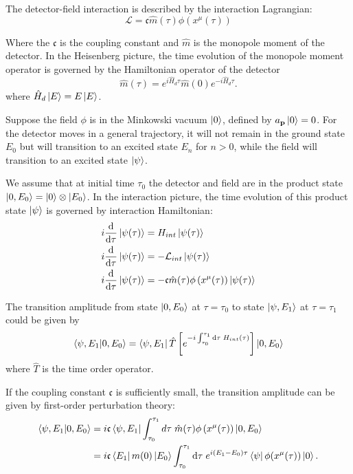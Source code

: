 \documentclass[12pt]{article}
\numberwithin{equation}{subsection}
\theoremstyle{mystyle}{\newtheorem{definition}{Definition}[subsection]}
\theoremstyle{mystyle}{\newtheorem{theorem}[definition]{Theorem}}
\theoremstyle{mystyle}{\newtheorem*{remark}{Remark}}
\theoremstyle{mystyle}{\newtheorem{example}{Example}[subsection]}
\theoremstyle{mystyle}{\newtheorem{examples}{Examples}[subsection]}
\theoremstyle{mystyle}{\newtheorem{cthm}{}[subsection]}
\newcommand{\id}{\mathrm{d}}
\begin{document}
\par The detector-field interaction is described by the interaction Lagrangian:
\begin{equation}
  \mathcal{L}=\mathfrak{c} \hat{m}(\tau)\phi\left(x^{\mu}(\tau)\right)
\end{equation}

Where the \(\mathfrak{c}\) is the coupling constant and \(\hat{m}\) is the monopole moment of the detector.
In the Heisenberg picture, the time evolution of the monopole moment operator is governed by the Hamiltonian operator of the detector
\begin{equation}
  \hat{m}(\tau)= e^{i\hat{H}_d\tau}\hat{m}(0)e^{-i\hat{H}_d\tau}.
\end{equation}
where \(\hat{H}_d\ket{E}=E\ket{E}\).

Suppose the field \(\phi\) is in the Minkowski vacuum \(\ket{0}\), defined by \(a_{\mathbf{p}}\ket{0}=0\).
For the detector moves in a general trajectory,
it will not remain in the ground state \(E_0\) but will transition to an excited state \(E_n\) for \(n>0\),
while the field will transition to an excited state \(\ket{\psi}\). 

We assume that at initial time \(\tau_0\) the detector and field are in the product state \(\ket{0,E_0}=\ket{0}\otimes\ket{E_0}\).
In the interaction picture, the time evolution of this product state \(\ket{\psi}\) is governed by interaction Hamiltonian:
\begin{align}
  i\frac{\id }{\id \tau}\ket{\psi(\tau)}&=H_{int}\ket{\psi(\tau)}\\
  i\frac{\id }{\id \tau}\ket{\psi(\tau)}&=-\mathcal{L}_{int}\ket{\psi(\tau)}\\
  i\frac{\id }{\id \tau}\ket{\psi(\tau)}&=-\mathfrak{c} \hat{m}(\tau)\phi\left(x^{\mu}(\tau)\right)\ket{\psi(\tau)}
\end{align}

The transition amplitude from state \(\ket{0,E_0}\) at \(\tau=\tau_0\)
to state \(\ket{\psi,E_1}\) at \(\tau=\tau_1\) could be given by 
\begin{equation}
  \braket{\psi,E_1}{0,E_0}=\bra{\psi,E_1}\hat{T}\left[e^{-i\int_{\tau_0}^{\tau_1}\id \tau\;H_{int}(\tau)}\right]\ket{0,E_0}
\end{equation}
where \(\hat{T}\) is the time order operator.

If the coupling constant \(\mathfrak{c}\) is sufficiently small, the transition amplitude can be given by first-order perturbation theory:
\begin{align}\label{TA1}
  \braket{\psi,E_1}{0,E_0}&=i\mathfrak{c} \bra{\psi,E_1}\int_{\tau_0}^{\tau_1}d\tau\;
  \hat{m}(\tau)\phi\left(x^{\mu}(\tau)\right)\ket{0,E_{0}}\\
  &=i\mathfrak{c}\bra{E_1}m(0)\ket{E_0}\int_{\tau_0}^{\tau_1}\id \tau\;e^{i(E_1-E_0)\tau}\bra{\psi}\phi(x^{\mu}(\tau))\ket{0}.
\end{align}
\end{document}
